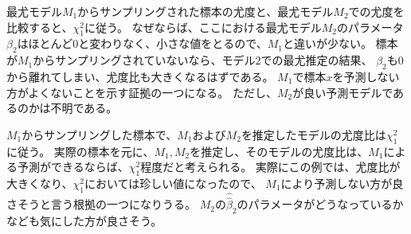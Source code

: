 最尤モデル$M_1$からサンプリングされた標本の尤度と、最尤モデル$M_2$での尤度を比較すると、$\chi^2_1$に従う。
なぜならば、ここにおける最尤モデル$M_2$のパラメータ$\beta_2$はほとんど0と変わりなく、小さな値をとるので、$M_1$と違いが少ない。
標本が$M_1$からサンプリングされていないなら、モデル$2$での最尤推定の結果、
$\beta_2$も$0$から離れてしまい、尤度比も大きくなるはずである。
$M_1$で標本$x$を予測しない方がよくないことを示す証拠の一つになる。
ただし、$M_2$が良い予測モデルであるのかは不明である。


$M_1$からサンプリングした標本で、$M_1$および$M_2$を推定したモデルの尤度比は$\chi^2_1$に従う。
実際の標本を元に、$M_1,M_2$を推定し、そのモデルの尤度比は、$M_1$による予測ができるならば、$\chi^2_1$程度だと考えられる。
実際にこの例では、尤度比が大きくなり、$\chi^2_1$においては珍しい値になったので、
$M_1$により予測しない方が良さそうと言う根拠の一つになりうる。
$M_2$の$\hat\hat\beta_2$のパラメータがどうなっているかなども気にした方が良さそう。







